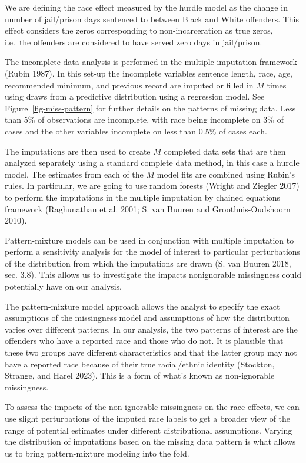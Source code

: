 \documentclass[
  letterpaper,
  DIV=11,
  numbers=noendperiod]{scrartcl}
\begin{document}
We are defining the race effect measured by the hurdle model as the
change in number of jail/prison days sentenced to between Black and
White offenders. This effect considers the zeros corresponding to
non-incarceration as true zeros, i.e.~the offenders are considered to
have served zero days in jail/prison.

The incomplete data analysis is performed in the multiple imputation
framework (Rubin 1987). In this set-up the incomplete variables sentence
length, race, age, recommended minimum, and previous record are imputed
or filled in \(M\) times using draws from a predictive distribution
using a regression model. See Figure~\ref{fig-miss-pattern} for further
details on the patterns of missing data. Less than 5\% of observations
are incomplete, with race being incomplete on 3\% of cases and the other
variables incomplete on less than 0.5\% of cases each.

The imputations are then used to create \(M\) completed data sets that
are then analyzed separately using a standard complete data method, in
this case a hurdle model. The estimates from each of the \(M\) model
fits are combined using Rubin's rules. In particular, we are going to
use random forests (Wright and Ziegler 2017) to perform the imputations
in the multiple imputation by chained equations framework (Raghunathan
et al. 2001; S. van Buuren and Groothuis-Oudshoorn 2010).

Pattern-mixture models can be used in conjunction with multiple
imputation to perform a sensitivity analysis for the model of interest
to particular perturbations of the distribution from which the
imputations are drawn (S. van Buuren 2018, sec. 3.8). This allows us to
investigate the impacts nonignorable missingness could potentially have
on our analysis.

The pattern-mixture model approach allows the analyst to specify the
exact assumptions of the missingness model and assumptions of how the
distribution varies over different patterns. In our analysis, the two
patterns of interest are the offenders who have a reported race and
those who do not. It is plausible that these two groups have different
characteristics and that the latter group may not have a reported race
because of their true racial/ethnic identity (Stockton, Strange, and
Harel 2023). This is a form of what's known as non-ignorable
missingness.

To assess the impacts of the non-ignorable missingness on the race
effects, we can use slight perturbations of the imputed race labels to
get a broader view of the range of potential estimates under different
distributional assumptions. Varying the distribution of imputations
based on the missing data pattern is what allows us to bring
pattern-mixture modeling into the fold.
\end{document}
